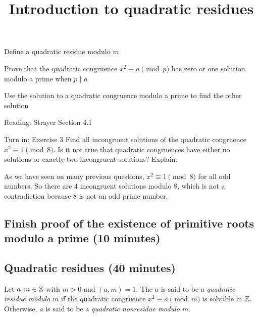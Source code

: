 \documentclass{ximera}
\title{Introduction to quadratic residues}
\begin{document}
\begin{abstract}
\end{abstract}
\maketitle


\begin{obj}
    \item Define a quadratic residue modulo $m$
    \item Prove that the quadratic congruence $x^2\equiv a\pmod{p}$ has zero or one solution modulo a prime when $p\nmid a$
    \item Use the solution to a quadratic congruence modulo a prime to find the other solution
\end{obj}


\begin{pre}
    \item[Reading:] Strayer Section 4.1
    \item[Turn in:] Exercise 3
     Find all incongruent solutions of the quadratic congruence $x^2\equiv 1\pmod{8}.$ Is it not true that quadratic congruences have either no solutions or exactly two incongruent solutions? Explain.

     \begin{solution}
        As we have seen on many previous questions, $x^2\equiv 1\pmod{8}$ for all odd numbers. So there are $4$ incongruent solutions modulo $8$, which is not a contradiction because $8$ is not an odd prime number.
     \end{solution}
\end{pre}

\subsection{Finish proof of the existence of primitive roots modulo a prime (10 minutes)}

\subsection{Quadratic residues (40 minutes)}


\begin{definition}\label{defn:quad-residue}
    Let $a,m\in\mathbb Z$ with $m>0$ and $(a,m)=1.$ The $a$ is said to be a \emph{quadratic residue modulo $m$} if the quadratic congruence $x^2\equiv a\pmod{m}$ is solvable in $\mathbb Z.$ Otherwise, $a$ is said to be a \emph{quadratic nonresidue modulo $m$}.
\end{definition}
\end{document}
